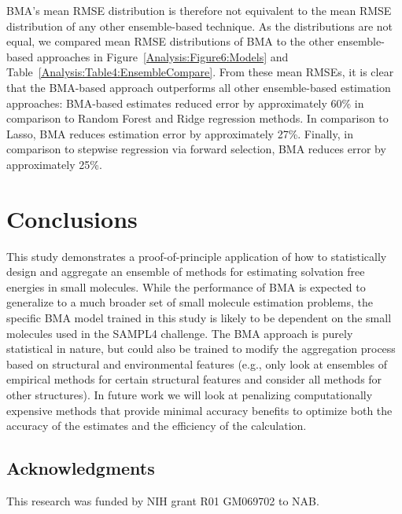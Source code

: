 \documentclass[journal=jpcbfk, manuscript=article]{achemso}
\newcommand{\+}[1]{\ensuremath{\mathbf{#1}}}
\begin{document}
BMA's mean RMSE distribution is therefore not equivalent to the mean RMSE distribution of any other ensemble-based technique. 
As the distributions are not equal, we compared mean RMSE distributions of BMA to the other ensemble-based approaches in Figure~\ref{Analysis:Figure6:Models} and Table~\ref{Analysis:Table4:EnsembleCompare}.
From these mean RMSEs, it is clear that the BMA-based approach outperforms all other ensemble-based estimation approaches: BMA-based estimates reduced error by approximately 60\% in comparison to Random Forest and Ridge regression methods. In comparison to Lasso, BMA reduces estimation error by approximately 27\%.
Finally, in comparison to stepwise regression via forward selection, BMA reduces error by approximately 25\%.

\section{Conclusions}
This study demonstrates a proof-of-principle application of how to statistically design and aggregate an ensemble of methods for estimating solvation free energies in small molecules.
While the performance of BMA is expected to generalize to a much broader set of small molecule estimation problems, the specific BMA model trained in this study is likely to be dependent on the small molecules used in the SAMPL4 challenge.
The BMA approach is purely statistical in nature, but could also be trained to modify the aggregation process based on structural and environmental features (e.g., only look at ensembles of empirical methods for certain structural features and consider all methods for other structures).
In future work we will look at penalizing computationally expensive methods that provide minimal accuracy benefits to optimize both the accuracy of the estimates and the efficiency of the calculation.

\subsection*{Acknowledgments}
This research was funded by NIH grant R01 GM069702 to NAB.


\end{document}
